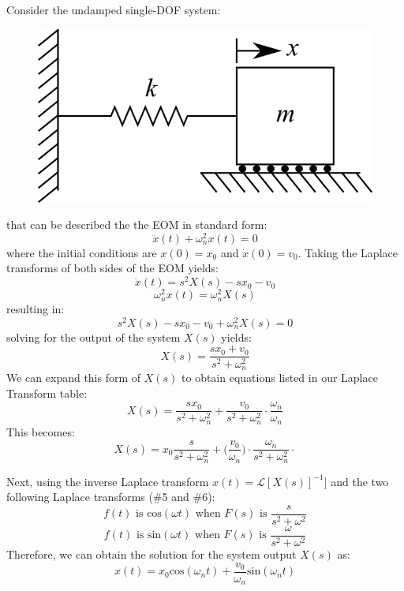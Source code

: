 \documentclass[12pt,letter]{article}
\numberwithin{ex}{section} %
\numberwithin{re}{section} %
\newcommand{\Laplace}[1]{\ensuremath{\mathcal{L}{\left[#1\right]}}}
\begin{document}
Consider the undamped single-DOF system:
\begin{figure}[H]
	\centering
	\includegraphics[]{../Figures/1-DOF-spring_mass_horizontal.png}
\end{figure}
that can be described the the EOM in standard form:
\begin{equation}
	\ddot{x}(t) + \omega_n^2x(t) = 0 
\end{equation}
where the initial conditions are $x(0)=x_0$ and $\dot{x}(0) = v_0$. Taking the Laplace transforms of both sides of the EOM yields:
\begin{equation}
	\ddot{x}(t)  = s^2X(s) -sx_0 -v_0
\end{equation}
\begin{equation}
	\omega_n^2x(t) = \omega_n^2X(s)
\end{equation}
resulting in:
\begin{equation}
	s^2X(s) -sx_0 -v_0 + \omega_n^2X(s) = 0
\end{equation}
solving for the output of the system $X(s)$ yields:
\begin{equation}
X(s) = \frac{sx_0 + v_0}{s^2 + \omega_n^2}
\end{equation}
We can expand this form of $X(s)$ to obtain equations listed in our Laplace Transform table:
\begin{equation}
X(s) = \frac{sx_0}{s^2 + \omega_n^2} + \frac{v_0}{s^2 + \omega_n^2}\cdot \frac{\omega_n}{\omega_n}
\end{equation}
This becomes:
\begin{equation}
X(s) = x_0\frac{s}{s^2 + \omega_n^2} + \bigg(\frac{v_0}{\omega_n}\bigg) \cdot \frac{\omega_n}{s^2 + \omega_n^2}\cdot 
\end{equation}

Next, using the inverse Laplace transform $x(t) = \Laplace{X(s)}^{-1}]$ and the two following Laplace transforms (\#5 and \#6):
\begin{equation}
f(t) \text{ is cos}(\omega t) \text{ when }  F(s) \text{ is } \frac{s}{s^2+\omega^2} 
\end{equation}
\begin{equation}
f(t) \text{ is sin}(\omega t)  \text{ when }  F(s) \text{ is } \frac{\omega}{s^2+\omega^2} 
\end{equation}
Therefore, we can obtain the solution for the system output $X(s)$ as:
\begin{equation}
x(t) = x_0 \text{cos}(\omega_n t) + \frac{v_0}{\omega_n}\text{sin}(\omega_n t)
\end{equation}
\end{document}

